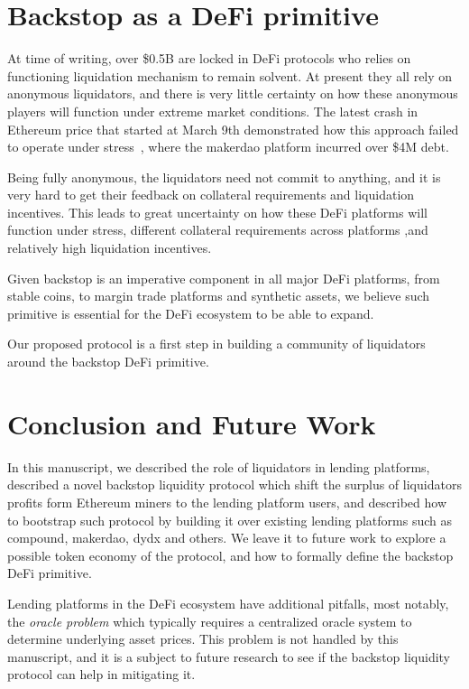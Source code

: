 \documentclass{article}
\begin{document}
\section{Backstop as a DeFi primitive}\label{sec:beyond}
At time of writing, over \$0.5B are locked in DeFi protocols who relies on functioning liquidation mechanism to remain solvent.
At present they all rely on anonymous liquidators, and there is very little certainty on how these anonymous players will function under extreme market conditions.
The latest crash in Ethereum price that started at March 9th demonstrated how this approach failed to operate under stress~\cite{longhash}, where the makerdao platform incurred over \$4M debt.

Being fully anonymous, the liquidators need not commit to anything, and it is very hard to get their feedback on collateral requirements and liquidation incentives.
This leads to great uncertainty on how these DeFi platforms will function under stress, different collateral requirements across platforms ,and relatively high liquidation incentives.

Given backstop is an imperative component in all major DeFi platforms, from stable coins, to margin trade platforms and synthetic assets, we believe such primitive is essential for the DeFi ecosystem to be able to expand.

Our proposed protocol is a first step in building a community of liquidators around the backstop DeFi primitive.

\section{Conclusion and Future Work}\label{sec:conc}
In this manuscript, we described the role of liquidators in lending platforms, described a novel backstop liquidity protocol which shift the surplus of liquidators profits form Ethereum miners to the lending platform users, and described how to bootstrap such protocol by building it over existing lending platforms such as compound, makerdao, dydx and others.
We leave it to future work to explore a possible token economy of the protocol, and how to formally define the backstop DeFi primitive.

Lending platforms in the DeFi ecosystem have additional pitfalls, most notably, the \emph{oracle problem} which typically requires a centralized oracle system to determine underlying asset prices.
This problem is not handled by this manuscript, and it is a subject to future research to see if the backstop liquidity protocol can help in mitigating it.

\printbibliography
\end{document}
